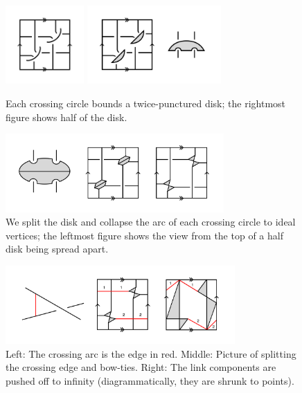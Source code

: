 \documentclass[11pt]{amsart}
\theoremstyle{plain}
\theoremstyle{definition}
\begin{document}
\begin{figure}[h] 
\centering
\includegraphics[height=3cm]{fig-3.png}
\includegraphics[height=3cm]{fig-4.png}
	\caption{Each crossing circle bounds a twice-punctured disk;
	the rightmost figure shows half of the disk.}
	\label{fig:step_one}
\end{figure}
 
\begin{figure}[h] 
\centering 
\includegraphics[height=3cm]{fig-5.png} 
	\caption{We split the disk and collapse the arc of each
 crossing circle to ideal vertices;
 the leftmost figure shows the view from the top
 of a half disk being spread apart.}
	\label{fig:step_two}
\end{figure}


\begin{figure}[h] 
\centering 
\includegraphics[height=3cm]{fig-6.png} 
\caption{Left: The crossing arc is the edge in red.
Middle: Picture of splitting the crossing edge
and bow-ties.
Right: The link components are pushed off to infinity
(diagrammatically, they are shrunk to points).}
	\label{fig:step_three}
\end{figure}
\end{document}
